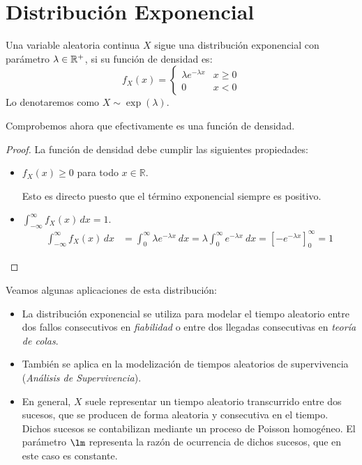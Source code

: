 \section{Distribución Exponencial}

\begin{definicion}
    Una variable aleatoria continua $X$ sigue una distribución exponencial con parámetro $\lambda\in \mathbb{R}^+$, si su función de densidad es:
    \begin{equation*}
        f_X(x) = \begin{cases}
            \lambda e^{-\lambda x} & x\geq 0\\
            0 & x<0
        \end{cases}
    \end{equation*}
    Lo denotaremos como $X\sim \exp(\lambda)$.
\end{definicion}

Comprobemos ahora que efectivamente es una función de densidad.
\begin{proof}
    La función de densidad debe cumplir las siguientes propiedades:
    \begin{itemize}
        \item $f_X(x)\geq 0$ para todo $x\in \mathbb{R}$.
        
        Esto es directo puesto que el término exponencial siempre es positivo.
        
        \item $\displaystyle \int_{-\infty}^{\infty} f_X(x) \, dx = 1$.
        \begin{align*}
            \int_{-\infty}^{\infty} f_X(x) \, dx &= \int_{0}^{\infty} \lambda e^{-\lambda x}~dx = \lambda \int_{0}^{\infty} e^{-\lambda x}~dx = \left[ -e^{-\lambda x} \right]_{0}^{\infty}
            = 1
        \end{align*}
    \end{itemize}
\end{proof}

Veamos algunas aplicaciones de esta distribución:
\begin{itemize}
    \item La distribución exponencial se utiliza para modelar el tiempo aleatorio entre dos fallos consecutivos en \emph{fiabilidad}
    o entre dos llegadas consecutivas en \emph{teoría de colas}.

    \item También se aplica en la modelización de tiempos aleatorios de supervivencia (\emph{Análisis de Supervivencia}).
    
    \item En general, $X$ suele representar un tiempo aleatorio transcurrido entre dos
    sucesos, que se producen de forma aleatoria y consecutiva en el tiempo.
    Dichos sucesos se contabilizan mediante un proceso de Poisson homogéneo.
    El parámetro $\lm$ representa la razón de ocurrencia de dichos sucesos, que
    en este caso es constante.
\end{itemize}

